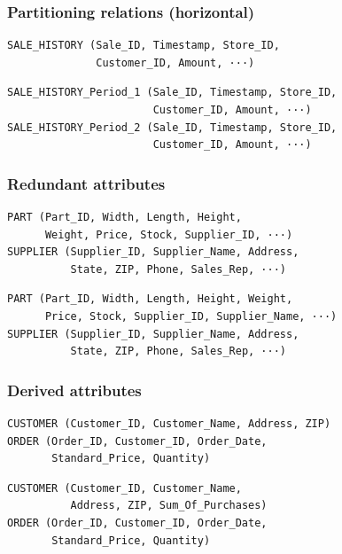 \documentclass{beamer}
\begin{document}
\begin{frame}[fragile]
\frametitle{Partitioning relations (horizontal)}


\begin{verbatim}
SALE_HISTORY (Sale_ID, Timestamp, Store_ID, 
              Customer_ID, Amount, ···)
\end{verbatim}

\vspace{\baselineskip}

\begin{verbatim}
SALE_HISTORY_Period_1 (Sale_ID, Timestamp, Store_ID, 
                       Customer_ID, Amount, ···) 
SALE_HISTORY_Period_2 (Sale_ID, Timestamp, Store_ID, 
                       Customer_ID, Amount, ···) 
\end{verbatim}

\end{frame}

\begin{frame}[fragile]
\frametitle{Redundant attributes}

\begin{verbatim}
PART (Part_ID, Width, Length, Height, 
      Weight, Price, Stock, Supplier_ID, ···) 
SUPPLIER (Supplier_ID, Supplier_Name, Address, 
          State, ZIP, Phone, Sales_Rep, ···) 
\end{verbatim}

\vspace{\baselineskip}

\begin{verbatim}
PART (Part_ID, Width, Length, Height, Weight, 
      Price, Stock, Supplier_ID, Supplier_Name, ···) 
SUPPLIER (Supplier_ID, Supplier_Name, Address, 
          State, ZIP, Phone, Sales_Rep, ···)
\end{verbatim}

\end{frame}



\begin{frame}[fragile]
\frametitle{Derived attributes}

\begin{verbatim}
CUSTOMER (Customer_ID, Customer_Name, Address, ZIP)
ORDER (Order_ID, Customer_ID, Order_Date, 
       Standard_Price, Quantity) 
\end{verbatim}

\vspace{\baselineskip}

\begin{verbatim}
CUSTOMER (Customer_ID, Customer_Name, 
          Address, ZIP, Sum_Of_Purchases) 
ORDER (Order_ID, Customer_ID, Order_Date, 
       Standard_Price, Quantity)
\end{verbatim}

\end{frame}
\end{document}
